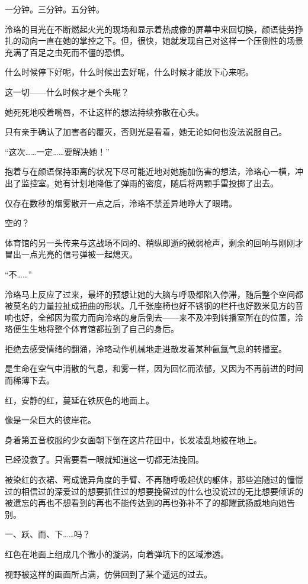 \documentclass[UTF8, scheme = chinese, openany]{ctexbook}
\begin{document}
一分钟。三分钟。五分钟。

泠珞的目光在不断燃起火光的现场和显示着热成像的屏幕中来回切换，颜语徒劳挣扎的动向一直在她的掌控之下。但，很快，她就发现自己对这样一个压倒性的场景充满了百足之虫死而不僵的恐惧。

什么时候停下好呢，什么时候出去好呢，什么时候才能放下心来呢。

这一切——什么时候才是个头呢？

她死死地咬着嘴唇，不让这样的想法持续弥散在心头。

只有亲手确认了加害者的覆灭，否则光是看着，她无论如何也没法说服自己。

“这次……一定……要解决她！”

抱着与在颜语保持距离的状况下尽可能近地对她施加伤害的想法，泠珞心一横，冲出了监控室。她有计划地降低了弹雨的密度，随后将两颗手雷投掷了出去。

仅存在数秒的烟雾散开一点之后，泠珞不禁差异地睁大了眼睛。

空的？

体育馆的另一头传来与这战场不同的、稍纵即逝的微弱枪声，剩余的回响与刚刚才冒出一点光亮的信号弹被一起熄灭。

“不……”

泠珞马上反应了过来，最坏的预想让她的大脑与呼吸都陷入停滞，随后整个空间都被莫名的力量拉扯成扭曲的形状。几千张座椅也好不锈钢的栏杆也好数米见方的音响也好，全部因为蛮力而向泠珞的身后倒去——来不及冲到转播室所在的位置，泠珞便生生地将整个体育馆都拉到了自己的身后。

拒绝去感受情绪的翻涌，泠珞动作机械地走进散发着某种氤氲气息的转播室。

是生命在空气中消散的气息，和雾一样，因为回忆而浓郁，又因为不再前进的时间而稀薄下去。

红，安静的红，蔓延在铁灰色的地面上。

像是一朵巨大的彼岸花。

身着第五音校服的少女面朝下倒在这片花田中，长发凌乱地披在地上。

已经没救了。只需要看一眼就知道这一切都无法挽回。

被染红的衣裙、弯成诡异角度的手臂、不再随呼吸起伏的躯体，那些追随过的憧憬过的相信过的深爱过的想要抓住过的想要挽留过的什么也没说过的无比想要倾诉的被遗忘的再也不想看到的再也不能传达到的再也弥补不了的都耀武扬威地向她告别。

一、跃、而、下……吗？

红色在地面上组成几个微小的漩涡，向着弹坑下的区域渗透。

视野被这样的画面所占满，仿佛回到了某个遥远的过去。
\end{document}
